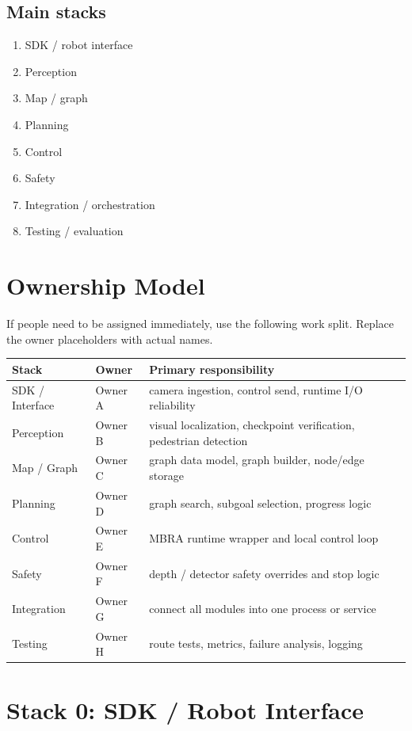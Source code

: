 \documentclass[11pt,a4paper]{article}
\begin{document}
\subsection*{Main stacks}

\begin{enumerate}[nosep]
  \item SDK / robot interface
  \item Perception
  \item Map / graph
  \item Planning
  \item Control
  \item Safety
  \item Integration / orchestration
  \item Testing / evaluation
\end{enumerate}


\section{Ownership Model}

If people need to be assigned immediately, use the following work split.
Replace the owner placeholders with actual names.

\begin{tabularx}{\textwidth}{p{} p{} X}
\toprule
\textbf{Stack} & \textbf{Owner} & \textbf{Primary responsibility} \\
\midrule
SDK / Interface & Owner A & camera ingestion, control send, runtime I/O reliability \\
Perception & Owner B & visual localization, checkpoint verification, pedestrian detection \\
Map / Graph & Owner C & graph data model, graph builder, node/edge storage \\
Planning & Owner D & graph search, subgoal selection, progress logic \\
Control & Owner E & MBRA runtime wrapper and local control loop \\
Safety & Owner F & depth / detector safety overrides and stop logic \\
Integration & Owner G & connect all modules into one process or service \\
Testing & Owner H & route tests, metrics, failure analysis, logging \\
\bottomrule
\end{tabularx}


\section{Stack 0: SDK / Robot Interface}
\end{document}
